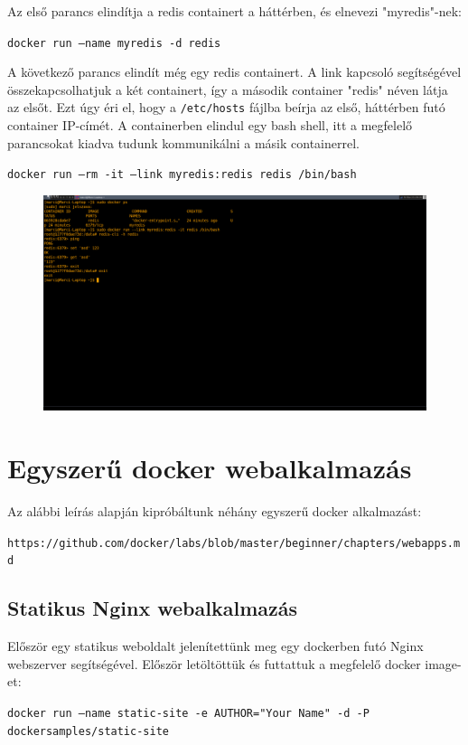 \documentclass[]{article}
\numberwithin{equation}{section}
\begin{document}
Az első parancs elindítja a redis containert a háttérben, és elnevezi "myredis"-nek:

\texttt{docker run --name myredis -d redis}

A következő parancs elindít még egy redis containert. A link kapcsoló segítségével összekapcsolhatjuk a két containert, így a második container "redis" néven látja az elsőt. Ezt úgy éri el, hogy a \texttt{/etc/hosts} fájlba beírja az első, háttérben futó container IP-címét. A containerben elindul egy bash shell, itt a megfelelő parancsokat kiadva tudunk kommunikálni a másik containerrel.

\texttt{docker run --rm -it --link myredis:redis redis /bin/bash}

\begin{figure}[H]
	\centering
	\includegraphics[width=0.9\linewidth]{redis.png}
	\caption{}
	\label{fig:redis}
\end{figure}

\section{Egyszerű docker webalkalmazás}

Az alábbi leírás alapján kipróbáltunk néhány egyszerű docker alkalmazást:

\texttt{https://github.com/docker/labs/blob/master/beginner/chapters/webapps.md}

\subsection{Statikus Nginx webalkalmazás}

Először egy statikus weboldalt jelenítettünk meg egy dockerben futó Nginx webszerver segítségével. Először letöltöttük és futtattuk a megfelelő docker image-et:

\texttt{docker run --name static-site -e AUTHOR="Your Name" -d -P dockersamples/static-site}
\end{document}
